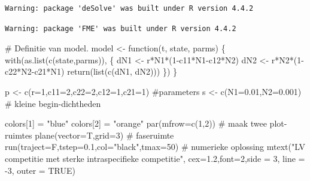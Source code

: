 \documentclass[
  a4paper,
]{scrbook}
\newenvironment{Shaded}{\begin{snugshade}}{\end{snugshade}}
\newcommand{\AttributeTok}[1]{\textcolor[rgb]{0.40,0.45,0.13}{#1}}
\newcommand{\CommentTok}[1]{\textcolor[rgb]{0.37,0.37,0.37}{#1}}
\newcommand{\ConstantTok}[1]{\textcolor[rgb]{0.56,0.35,0.01}{#1}}
\newcommand{\ControlFlowTok}[1]{\textcolor[rgb]{0.00,0.23,0.31}{#1}}
\newcommand{\DecValTok}[1]{\textcolor[rgb]{0.68,0.00,0.00}{#1}}
\newcommand{\FloatTok}[1]{\textcolor[rgb]{0.68,0.00,0.00}{#1}}
\newcommand{\FunctionTok}[1]{\textcolor[rgb]{0.28,0.35,0.67}{#1}}
\newcommand{\NormalTok}[1]{\textcolor[rgb]{0.00,0.23,0.31}{#1}}
\newcommand{\OtherTok}[1]{\textcolor[rgb]{0.00,0.23,0.31}{#1}}
\newcommand{\SpecialCharTok}[1]{\textcolor[rgb]{0.37,0.37,0.37}{#1}}
\newcommand{\StringTok}[1]{\textcolor[rgb]{0.13,0.47,0.30}{#1}}
\theoremstyle{definition}
\theoremstyle{remark}
\begin{document}
\begin{verbatim}
Warning: package 'deSolve' was built under R version 4.4.2
\end{verbatim}

\begin{verbatim}
Warning: package 'FME' was built under R version 4.4.2
\end{verbatim}

\begin{Shaded}
\begin{Highlighting}[]
\CommentTok{\# Definitie van model. }
\NormalTok{model }\OtherTok{\textless{}{-}} \ControlFlowTok{function}\NormalTok{(t, state, parms) \{}
  \FunctionTok{with}\NormalTok{(}\FunctionTok{as.list}\NormalTok{(}\FunctionTok{c}\NormalTok{(state,parms)), \{}
\NormalTok{    dN1 }\OtherTok{\textless{}{-}}\NormalTok{ r}\SpecialCharTok{*}\NormalTok{N1}\SpecialCharTok{*}\NormalTok{(}\DecValTok{1}\SpecialCharTok{{-}}\NormalTok{c11}\SpecialCharTok{*}\NormalTok{N1}\SpecialCharTok{{-}}\NormalTok{c12}\SpecialCharTok{*}\NormalTok{N2)}
\NormalTok{    dN2 }\OtherTok{\textless{}{-}}\NormalTok{ r}\SpecialCharTok{*}\NormalTok{N2}\SpecialCharTok{*}\NormalTok{(}\DecValTok{1}\SpecialCharTok{{-}}\NormalTok{c22}\SpecialCharTok{*}\NormalTok{N2}\SpecialCharTok{{-}}\NormalTok{c21}\SpecialCharTok{*}\NormalTok{N1)}
    \FunctionTok{return}\NormalTok{(}\FunctionTok{list}\NormalTok{(}\FunctionTok{c}\NormalTok{(dN1, dN2)))  }
\NormalTok{  \}) }
\NormalTok{\}  }


\NormalTok{p }\OtherTok{\textless{}{-}} \FunctionTok{c}\NormalTok{(}\AttributeTok{r=}\DecValTok{1}\NormalTok{,}\AttributeTok{c11=}\DecValTok{2}\NormalTok{,}\AttributeTok{c22=}\DecValTok{2}\NormalTok{,}\AttributeTok{c12=}\DecValTok{1}\NormalTok{,}\AttributeTok{c21=}\DecValTok{1}\NormalTok{)  }\CommentTok{\#parameters}
\NormalTok{s }\OtherTok{\textless{}{-}} \FunctionTok{c}\NormalTok{(}\AttributeTok{N1=}\FloatTok{0.01}\NormalTok{,}\AttributeTok{N2=}\FloatTok{0.001}\NormalTok{) }\CommentTok{\# kleine begin{-}dichtheden}

\NormalTok{colors[}\DecValTok{1}\NormalTok{] }\OtherTok{=} \StringTok{"blue"}
\NormalTok{colors[}\DecValTok{2}\NormalTok{] }\OtherTok{=} \StringTok{"orange"}
\FunctionTok{par}\NormalTok{(}\AttributeTok{mfrow=}\FunctionTok{c}\NormalTok{(}\DecValTok{1}\NormalTok{,}\DecValTok{2}\NormalTok{)) }\CommentTok{\# maak twee plot{-}ruimtes}
\FunctionTok{plane}\NormalTok{(}\AttributeTok{vector=}\NormalTok{T,}\AttributeTok{grid=}\DecValTok{3}\NormalTok{) }\CommentTok{\# faseruimte }
\FunctionTok{run}\NormalTok{(}\AttributeTok{traject=}\NormalTok{F,}\AttributeTok{tstep=}\FloatTok{0.1}\NormalTok{,}\AttributeTok{col=}\StringTok{"black"}\NormalTok{,}\AttributeTok{tmax=}\DecValTok{50}\NormalTok{) }\CommentTok{\# numerieke oplossing}
\FunctionTok{mtext}\NormalTok{(}\StringTok{"LV competitie met sterke intraspecifieke competitie"}\NormalTok{, }\AttributeTok{cex=}\FloatTok{1.2}\NormalTok{,}\AttributeTok{font=}\DecValTok{2}\NormalTok{,}\AttributeTok{side =} \DecValTok{3}\NormalTok{, }\AttributeTok{line =} \SpecialCharTok{{-}}\DecValTok{3}\NormalTok{, }\AttributeTok{outer =} \ConstantTok{TRUE}\NormalTok{)}
\end{Highlighting}
\end{Shaded}
\end{document}
